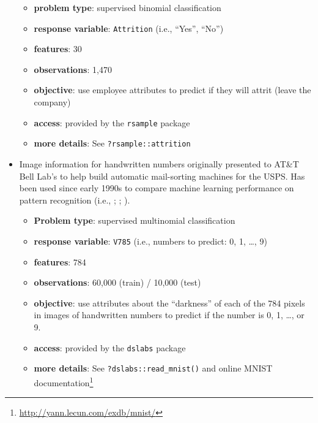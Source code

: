 \documentclass[]{krantz}
\makeatletter
\newenvironment{Shaded}{\begin{snugshade}}{\end{snugshade}}
\newcommand{\CommentTok}[1]{\textcolor[rgb]{0.37,0.37,0.37}{\textit{#1}}}
\newcommand{\KeywordTok}[1]{\textcolor[rgb]{0.27,0.27,0.27}{\textbf{#1}}}
\newcommand{\NormalTok}[1]{#1}
\newcommand{\OperatorTok}[1]{\textcolor[rgb]{0.43,0.43,0.43}{\textbf{#1}}}
\newcommand{\StringTok}[1]{\textcolor[rgb]{0.5,0.5,0.5}{#1}}
\providecommand{\tightlist}{%
  \setlength{\itemsep}{0pt}\setlength{\parskip}{0pt}}
\renewcommand{\href}[2]{#2\footnote{\url{#1}}}
\newenvironment{kframe}{%
\medskip{}
\setlength{\fboxsep}{.8em}
 \def\at@end@of@kframe{}%
 \ifinner\ifhmode%
  \def\at@end@of@kframe{\end{minipage}}%
  \begin{minipage}{\columnwidth}%
 \fi\fi%
 \def\FrameCommand##1{\hskip\@totalleftmargin \hskip-\fboxsep
 \colorbox{shadecolor}{##1}\hskip-\fboxsep
     \hskip-\linewidth \hskip-\@totalleftmargin \hskip\columnwidth}%
 \MakeFramed {\advance\hsize-\width
   \@totalleftmargin\z@ \linewidth\hsize
   \@setminipage}}%
 {\par\unskip\endMakeFramed%
 \at@end@of@kframe}
\renewenvironment{Shaded}{\begin{kframe}}{\end{kframe}}
\makeatother
\begin{document}
\begin{itemize}
  \begin{itemize}
  \tightlist
  \item
    \textbf{problem type}: supervised binomial classification
  \item
    \textbf{response variable}: \texttt{Attrition} (i.e., ``Yes'', ``No'')
  \item
    \textbf{features}: 30
  \item
    \textbf{observations}: 1,470
  \item
    \textbf{objective}: use employee attributes to predict if they will attrit (leave the company)
  \item
    \textbf{access}: provided by the \texttt{rsample} package \citep{R-rsample}
  \item
    \textbf{more details}: See \texttt{?rsample::attrition}
  \end{itemize}

\begin{Shaded}
\end{Shaded}
\item
  Image information for handwritten numbers originally presented to AT\&T Bell Lab's to help build automatic mail-sorting machines for the USPS. Has been used since early 1990s to compare machine learning performance on pattern recognition (i.e., \citet{lecun1990handwritten}; \citet{lecun1998gradient}; \citet{cirecsan2012multi}).

  \begin{itemize}
  \tightlist
  \item
    \textbf{Problem type}: supervised multinomial classification
  \item
    \textbf{response variable}: \texttt{V785} (i.e., numbers to predict: 0, 1, \ldots{}, 9)
  \item
    \textbf{features}: 784
  \item
    \textbf{observations}: 60,000 (train) / 10,000 (test)
  \item
    \textbf{objective}: use attributes about the ``darkness'' of each of the 784 pixels in images of handwritten numbers to predict if the number is 0, 1, \ldots{}, or 9.
  \item
    \textbf{access}: provided by the \texttt{dslabs} package \citep{R-dslabs}
  \item
    \textbf{more details}: See \texttt{?dslabs::read\_mnist()} and \href{http://yann.lecun.com/exdb/mnist/}{online MNIST documentation}
  \end{itemize}


\end{itemize}
\end{document}
